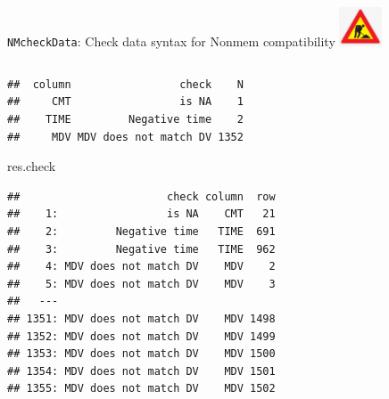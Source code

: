 \documentclass[
  8pt,
  ignorenonframetext,
  aspectratio=169]{beamer}
\newenvironment{Shaded}{\begin{snugshade}}{\end{snugshade}}
\newcommand{\NormalTok}[1]{#1}
\begin{document}
\begin{frame}[fragile]{\texttt{NMcheckData}: Check data syntax for
Nonmem compatibility
\includegraphics[width=0.5in]{figures/worksign.png}}
\begin{columns}[T]
\begin{column}{0.48\textwidth}
\begin{verbatim}
##  column                 check    N
##     CMT                 is NA    1
##    TIME         Negative time    2
##     MDV MDV does not match DV 1352
\end{verbatim}

\begin{Shaded}
\begin{Highlighting}[]
\NormalTok{res.check}
\end{Highlighting}
\end{Shaded}

\begin{verbatim}
##                       check column  row
##    1:                 is NA    CMT   21
##    2:         Negative time   TIME  691
##    3:         Negative time   TIME  962
##    4: MDV does not match DV    MDV    2
##    5: MDV does not match DV    MDV    3
##   ---                                  
## 1351: MDV does not match DV    MDV 1498
## 1352: MDV does not match DV    MDV 1499
## 1353: MDV does not match DV    MDV 1500
## 1354: MDV does not match DV    MDV 1501
## 1355: MDV does not match DV    MDV 1502
\end{verbatim}
\end{column}
\end{columns}
\end{frame}
\end{document}
